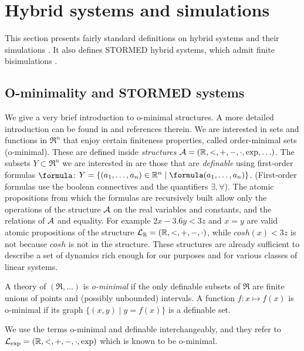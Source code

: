 \section{Hybrid systems and simulations}
\label{sec:preliminaries}

This section presents fairly standard definitions on 
hybrid systems and their simulations \cite{AlurHLP00ieee}.
It also defines STORMED hybrid systems, which admit finite bisimulations \cite{VladimerouPVD08_STORMED}.




\subsection{O-minimality and STORMED systems}
\label{sec:ominimality}
We give a very brief introduction to o-minimal structures.
A more detailed introduction can be found in \cite{LaFerrierePS00_Ominimal} and references therein.
We are interested in sets and functions in $\Re^n$ that enjoy certain finiteness properties, called order-minimal sets (o-minimal).
These are defined inside \emph{structures} $\mathcal{A} = (\mathbb{R},<, +,-,\cdot,\exp,\ldots)$.
The subsets $Y \subset \Re^n$ we are interested in are those that are \emph{definable} using first-order formulas $\formula$: $Y = \{(a_1,\ldots,a_n) \in \Re^n \;|\;  \formula(a_1,\ldots,a_n)\}$.
(First-order formulas use the boolean connectives and the quantifiers $\exists,\forall$).
The atomic propositions from which the formulas are recursively built allow only the operations of the structure $\mathcal{A}$ on the real variables and constants, and the relations of $\mathcal{A}$ and equality.
For example $2x-3.6y < 3z$ and $x=y$ are valid atomic propositions of the structure $\mathcal{L}_{\mathbb{R}}=(\mathbb{R},<, +,-,\cdot)$, while $cosh(x) < 3z$ is not because $cosh$ is not in the structure.
These structures are already sufficient to describe a set of dynamics rich enough for our purposes and for various classes of linear systems.
%
\begin{defn}
	\label{defn:ominimal struct}	
	A theory of $(\Re,\ldots)$ is \emph{o-minimal} if the only definable subsets of $\Re$ are finite unions of points and (possibly unbounded) intervals.	
	A function $f:x \mapsto f(x)$ is o-minimal if its graph $\{(x,y) \;|\; y=f(x)\}$ is a definable set.
\end{defn}
We use the terms o-minimal and definable interchangeably, and they refer to $\mathcal{L}_{\exp}= (\mathbb{R},<, +,-,\cdot,\exp)$ which is known to be o-minimal.
